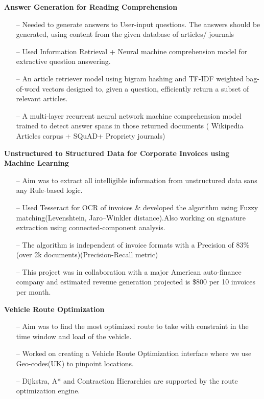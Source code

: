 \documentclass[margin,line]{templates/resume}
\newcommand{\myhref}[3][blue]{\href{#2}{\color{#1}{#3}}}
\newcommand{\compresslist}{%
\setlength{\itemsep}{3pt}%
\setlength{\parskip}{0pt}%
\setlength{\parsep}{0pt}%
}
\begin{document}
\begin{resume}
\vspace{-0.1cm}    
\textsf{\textbf{Answer Generation for Reading Comprehension}} \hfill{\myhref[darkblue]{https://esha-singh.github.io/\#mpi}{Web}}
\vspace{0.05cm}
\begin{itemize}[leftmargin=*]\compresslist
\item[--]Needed to generate answers to User-input questions. The answers should be generated, using content from the given database of articles/ journals
\item[--]Used Information Retrieval + Neural  machine comprehension model for extractive question answering.
\item[--]An article retriever model using bigram hashing and TF-IDF weighted bag-of-word vectors designed to, given a question, efficiently return a subset of relevant articles.
\item[--]A multi-layer recurrent neural network machine comprehension model trained to detect answer spans in those returned documents ( Wikipedia Articles corpus + SQuAD+ Propriety journals)
\end{itemize}

\newpage
\vspace{-0.1cm} 
\textsf{\textbf{Unstructured to Structured Data for Corporate Invoices using Machine Learning}}\hfill{\myhref[darkblue]{https://esha-singh.github.io/\#mpi}{Web}}
\vspace{0.05cm}
\begin{itemize}[leftmargin=*]\compresslist
\item[--]Aim was to extract all intelligible information from unstructured data sans any Rule-based logic. 
\item[--]Used Tesseract for OCR of invoices \& developed the algorithm using Fuzzy matching(Levenshtein, Jaro–Winkler distance).Also working on signature extraction using connected-component analysis.
\item[--]The algorithm is independent of invoice formats with a Precision of 83\% (over 2k documents)(Precision-Recall metric)
\item[--]This project was in collaboration with a major American auto-finance company and estimated revenue generation projected is \$800 per 10 invoices per month.

\end{itemize}

\vspace{-0.1cm}    
\textsf{\textbf{Vehicle Route Optimization}} \hfill{\myhref[darkblue]{https://esha-singh.github.io/\#mpi}{Web}}
\vspace{0.05cm}
\begin{itemize}[leftmargin=*]\compresslist
    \item[--]Aim was to find the most optimized route to take with constraint in the time window and load of the vehicle.
   \item[--] Worked on creating a Vehicle Route Optimization interface where we use Geo-codes(UK) to pinpoint locations. 
   \item[--]Dijkstra, A* and Contraction Hierarchies are supported by the route optimization engine.
\end{itemize}


\end{resume}
\end{document}
